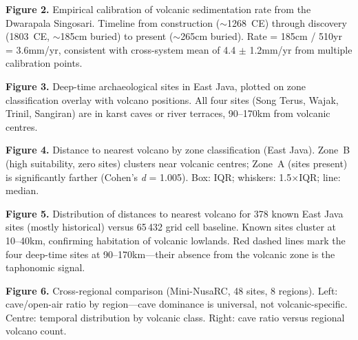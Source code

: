 \documentclass[12pt]{article}
\begin{document}
\textbf{Figure 2.} Empirical calibration of volcanic sedimentation rate from the Dwarapala Singosari. Timeline from construction ($\sim$1268~CE) through discovery (1803~CE, $\sim$185cm buried) to present ($\sim$265cm buried). Rate = 185cm / 510yr = 3.6mm/yr, consistent with cross-system mean of 4.4 $\pm$ 1.2mm/yr from multiple calibration points.

\textbf{Figure 3.} Deep-time archaeological sites in East Java, plotted on zone classification overlay with volcano positions. All four sites (Song Terus, Wajak, Trinil, Sangiran) are in karst caves or river terraces, 90--170km from volcanic centres.

\textbf{Figure 4.} Distance to nearest volcano by zone classification (East Java). Zone~B (high suitability, zero sites) clusters near volcanic centres; Zone~A (sites present) is significantly farther (Cohen's \textit{d} = 1.005). Box: IQR; whiskers: 1.5$\times$IQR; line: median.

\textbf{Figure 5.} Distribution of distances to nearest volcano for 378 known East Java sites (mostly historical) versus 65\,432 grid cell baseline. Known sites cluster at 10--40km, confirming habitation of volcanic lowlands. Red dashed lines mark the four deep-time sites at 90--170km---their absence from the volcanic zone is the taphonomic signal.

\textbf{Figure 6.} Cross-regional comparison (Mini-NusaRC, 48 sites, 8 regions). Left: cave/open-air ratio by region---cave dominance is universal, not volcanic-specific. Centre: temporal distribution by volcanic class. Right: cave ratio versus regional volcano count.
\end{document}
